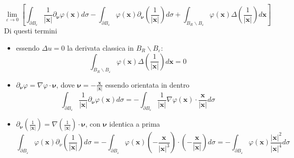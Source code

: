 \documentclass[10pt,a4paper,twoside,openright]{book}
\begin{document}
\begin{equation}
\lim _{\varepsilon \rightarrow 0}\left[\int _{\partial B_{\varepsilon }}\frac{1}{| \mathbf{x}| } \partial _{\bm{\nu }} \varphi (\mathbf{x}) d\sigma -\int _{\partial B_{\varepsilon }} \varphi (\mathbf{x}) \partial _{\bm{\nu }}\left(\frac{1}{| \mathbf{x}| }\right) d\sigma +\int _{B_{R} \backslash B_{\varepsilon }} \varphi (\mathbf{x}) \Delta \left(\frac{1}{| \mathbf{x}| }\right) d\mathbf{x}\right]
\label{eq:esempio-derivata-limite-2}
\end{equation}
Di questi termini
\begin{itemize}
\item essendo $\displaystyle \Delta u=0$ la derivata classica in $\displaystyle B_{R} \backslash B_{\varepsilon }$:\begin{equation*}
\int _{B_{R} \backslash B_{\varepsilon }} \varphi (\mathbf{x}) \Delta \left(\frac{1}{| \mathbf{x}| }\right) d\mathbf{x} =0
\end{equation*}
\item  $\displaystyle \partial _{\bm{\nu }} \varphi =\nabla \varphi \cdotp \bm{\nu }$, dove $\displaystyle \bm{\nu } =-\frac{\mathbf{x}}{| \mathbf{x}| }$ essendo orientata in dentro\begin{equation*}
\int _{\partial B_{\varepsilon }}\frac{1}{| \mathbf{x}| } \partial _{\bm{\nu }} \varphi (\mathbf{x}) d\sigma =-\int _{\partial B_{\varepsilon }}\frac{1}{| \mathbf{x}| } \nabla \varphi (\mathbf{x}) \cdotp \frac{\mathbf{x}}{| \mathbf{x}| } d\sigma 
\end{equation*}
\item $\displaystyle \partial _{\bm{\nu }}\left(\frac{1}{| \mathbf{x}| }\right) =\nabla \left(\frac{1}{| \mathbf{x}| }\right) \cdotp \bm{\nu }$, con $\displaystyle \bm{\nu }$ identica a prima\begin{equation*}
\int _{\partial B_{\varepsilon }} \varphi (\mathbf{x}) \partial _{\nu }\left(\frac{1}{| \mathbf{x}| }\right) d\sigma =-\int _{\partial B_{\varepsilon }} \varphi (\mathbf{x})\left( -\frac{\mathbf{x}}{| \mathbf{x}| ^{3}}\right) \cdotp \left( -\frac{\mathbf{x}}{| \mathbf{x}| }\right) d\sigma =-\int _{\partial B_{\varepsilon }} \varphi (\mathbf{x})\frac{| \mathbf{x}| ^{2}}{| \mathbf{x}| ^{4}} d\sigma 
\end{equation*}
\end{itemize}
\end{document}
